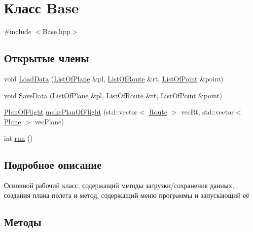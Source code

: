 \hypertarget{class_base}{}\section{Класс Base}
\label{class_base}


{\ttfamily \#include $<$Base.\+hpp$>$}

\subsection*{Открытые члены}
\begin{DoxyCompactItemize}
\item 
void \hyperlink{class_base_a3f5ae7fe9126f2473915d674b71a6ffd}{Load\+Data} (\hyperlink{class_list_of_plane}{List\+Of\+Plane} \&pl, \hyperlink{class_list_of_route}{List\+Of\+Route} \&rt, \hyperlink{class_list_of_point}{List\+Of\+Point} \&point)
\item 
void \hyperlink{class_base_a8f97c651d0b56270af329f72bd07f8ec}{Save\+Data} (\hyperlink{class_list_of_plane}{List\+Of\+Plane} \&pl, \hyperlink{class_list_of_route}{List\+Of\+Route} \&rt, \hyperlink{class_list_of_point}{List\+Of\+Point} \&point)
\item 
\hyperlink{class_plan_of_flight}{Plan\+Of\+Flight} \hyperlink{class_base_a278917b9fd932124d26c5f972fb94d4c}{make\+Plan\+Of\+Flight} (std\+::vector$<$ \hyperlink{class_route}{Route} $>$ vec\+Rt, std\+::vector$<$ \hyperlink{class_plane}{Plane} $>$ vec\+Plane)
\item 
int \hyperlink{class_base_af094f35baefd9149bba9d99bccc8789c}{run} ()
\end{DoxyCompactItemize}


\subsection{Подробное описание}
Основной рабочий класс, содержащий методы загрузки/сохранения данных, создания плана полета и метод, содержащий меню программы и запускающий её 

\subsection{Методы}
